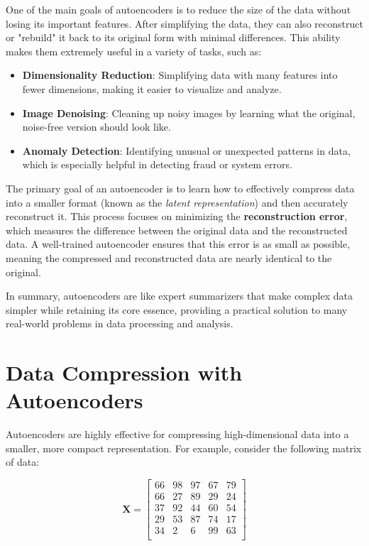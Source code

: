 \documentclass[a4paper,12pt]{article}
\begin{document}
One of the main goals of autoencoders is to reduce the size of the data without losing its important features. After simplifying the data, they can also reconstruct or "rebuild" it back to its original form with minimal differences. This ability makes them extremely useful in a variety of tasks, such as:  
\begin{itemize}
    \item \textbf{Dimensionality Reduction}: Simplifying data with many features into fewer dimensions, making it easier to visualize and analyze.  
    \item \textbf{Image Denoising}: Cleaning up noisy images by learning what the original, noise-free version should look like.  
    \item \textbf{Anomaly Detection}: Identifying unusual or unexpected patterns in data, which is especially helpful in detecting fraud or system errors.  
\end{itemize}  

The primary goal of an autoencoder is to learn how to effectively compress data into a smaller format (known as the \textit{latent representation}) and then accurately reconstruct it. This process focuses on minimizing the \textbf{reconstruction error}, which measures the difference between the original data and the reconstructed data. A well-trained autoencoder ensures that this error is as small as possible, meaning the compressed and reconstructed data are nearly identical to the original.  

In summary, autoencoders are like expert summarizers that make complex data simpler while retaining its core essence, providing a practical solution to many real-world problems in data processing and analysis.  


\section{Data Compression with Autoencoders}  
Autoencoders are highly effective for compressing high-dimensional data into a smaller, more compact representation. For example, consider the following matrix of data:

\begin{equation}
\mathbf{X} = 
\begin{bmatrix}
66 & 98 & 97 & 67 & 79 \\
66 & 27 & 89 & 29 & 24 \\
37 & 92 & 44 & 60 & 54 \\
29 & 53 & 87 & 74 & 17 \\
34 &  2 &  6 & 99 & 63 \\
\end{bmatrix}
\end{equation}
\end{document}
